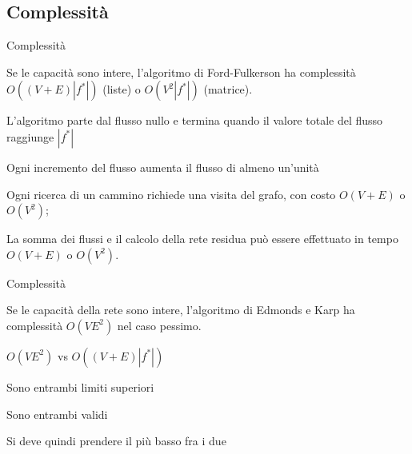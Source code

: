 \subsection{Complessità}


\begin{frame}{Complessità}

\vspace{-3pt}
\begin{myboxtitle}
Se le capacità sono \alert	{intere}, l'algoritmo di Ford-Fulkerson
ha complessità \alert{$O((V+E)|f^*|)$} (liste) o \alert{$O(V^2|f^*|)$} (matrice).
\end{myboxtitle}

\BIL
\item L'algoritmo parte dal flusso nullo e termina quando il valore totale
del flusso raggiunge $|f^*|$
\item Ogni incremento del flusso aumenta il flusso di almeno un'unità
\item Ogni ricerca di un cammino richiede una visita del grafo, con
costo $O(V+E)$ o $O(V^2)$; 
\item La somma dei flussi e il calcolo della rete residua può essere 
effettuato in tempo $O(V+E)$ o $O(V^2)$.
\EIL

\end{frame}

\begin{frame}{Complessità}

\vspace{-3pt}
\begin{myboxtitle}
Se le capacità della rete sono \alert{intere}, l'algoritmo di Edmonds e Karp
ha complessità \alert{$O(VE^2)$} nel caso pessimo.
\end{myboxtitle}


\BIL
\item $O(VE^2)$ vs $O((V+E)|f^*|)$
\item Sono entrambi limiti superiori
\item Sono entrambi validi
\item Si deve quindi prendere il più basso fra i due
\EIL

\end{frame}

